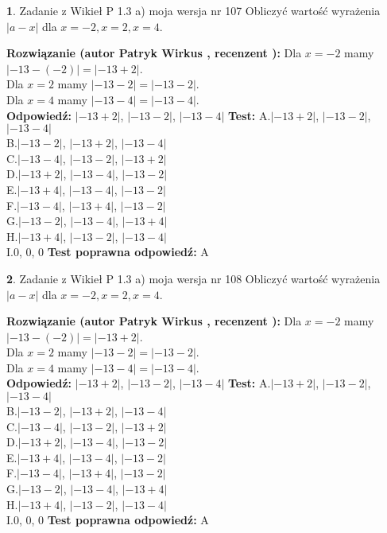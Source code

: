 \documentclass[12pt, a4paper]{article}
\theoremstyle{definition} %
\newtheorem{zad}{}
\newcommand{\zadStart}[1]{\begin{zad}#1\newline}
\newcommand{\zadStop}{\end{zad}}
\newcommand{\rozwStart}[2]{\noindent \textbf{Rozwiązanie (autor #1 , recenzent #2): }\newline}
\newcommand{\rozwStop}{\newline}
\newcommand{\odpStart}{\noindent \textbf{Odpowiedź:}\newline}
\newcommand{\odpStop}{\newline}
\newcommand{\testStart}{\noindent \textbf{Test:}\newline}
\newcommand{\testStop}{\newline}
\newcommand{\kluczStart}{\noindent \textbf{Test poprawna odpowiedź:}\newline}
\newcommand{\kluczStop}{\newline}
\begin{document}
\zadStart{Zadanie z Wikieł P 1.3 a) moja wersja nr 107}
Obliczyć wartość wyrażenia $|a - x|$ dla $x=-2,x=2,x=4$.
\zadStop
\rozwStart{Patryk Wirkus}{}
Dla $x = -2$ mamy $|-13 - (-2)| = |-13 + 2|$.\\
Dla $x = 2$ mamy $|-13 - 2| = |-13 - 2|$.\\
Dla $x = 4$ mamy $|-13 - 4| = |-13 - 4|$.\\
\rozwStop
\odpStart
$|-13 + 2|$, $|-13 - 2|$, $|-13 - 4|$
\odpStop
\testStart
A.$|-13 + 2|$, $|-13 - 2|$, $|-13 - 4|$\\
B.$|-13 - 2|$, $|-13 + 2|$, $|-13 - 4|$\\
C.$|-13 - 4|$, $|-13 - 2|$, $|-13 + 2|$\\
D.$|-13 + 2|$, $|-13 - 4|$, $|-13 - 2|$\\
E.$|-13 + 4|$, $|-13 - 4|$, $|-13 - 2|$\\
F.$|-13 - 4|$, $|-13 + 4|$, $|-13 - 2|$\\
G.$|-13 - 2|$, $|-13 - 4|$, $|-13 + 4|$\\
H.$|-13 + 4|$, $|-13 - 2|$, $|-13 - 4|$\\
I.$0$, $0$, $0$
\testStop
\kluczStart
A
\kluczStop



\zadStart{Zadanie z Wikieł P 1.3 a) moja wersja nr 108}
Obliczyć wartość wyrażenia $|a - x|$ dla $x=-2,x=2,x=4$.
\zadStop
\rozwStart{Patryk Wirkus}{}
Dla $x = -2$ mamy $|-13 - (-2)| = |-13 + 2|$.\\
Dla $x = 2$ mamy $|-13 - 2| = |-13 - 2|$.\\
Dla $x = 4$ mamy $|-13 - 4| = |-13 - 4|$.\\
\rozwStop
\odpStart
$|-13 + 2|$, $|-13 - 2|$, $|-13 - 4|$
\odpStop
\testStart
A.$|-13 + 2|$, $|-13 - 2|$, $|-13 - 4|$\\
B.$|-13 - 2|$, $|-13 + 2|$, $|-13 - 4|$\\
C.$|-13 - 4|$, $|-13 - 2|$, $|-13 + 2|$\\
D.$|-13 + 2|$, $|-13 - 4|$, $|-13 - 2|$\\
E.$|-13 + 4|$, $|-13 - 4|$, $|-13 - 2|$\\
F.$|-13 - 4|$, $|-13 + 4|$, $|-13 - 2|$\\
G.$|-13 - 2|$, $|-13 - 4|$, $|-13 + 4|$\\
H.$|-13 + 4|$, $|-13 - 2|$, $|-13 - 4|$\\
I.$0$, $0$, $0$
\testStop
\kluczStart
A
\kluczStop
\end{document}
